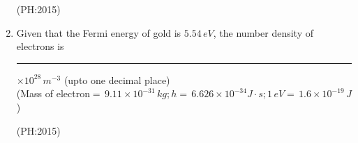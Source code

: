 \documentclass[journal,12pt,onecolumn]{IEEEtran}
\theoremstyle{remark}
\begin{document}
\begin{enumerate}
	\hfill{(PH:2015)}
	\vspace{0.5cm}
\item
	Given that the Fermi energy of gold is $5.54\, eV$, the number density of electrons is\\
	\rule{2cm}{0.4pt} $\times 10^{28}\, m^{-3}$ (upto one decimal place)\\
	\vspace{0.5cm}
(Mass of electron$=\, 9.11\times 10^{-31} \, kg;h=\, 6.626\times 10^{-34}J\cdot s; 1\, eV= \, 1.6\times 10^{-19}\, J$)

	\hfill{(PH:2015)}




\end{enumerate}
\end{document}
